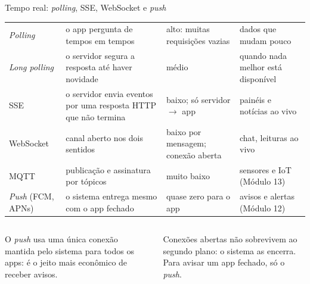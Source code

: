 \begin{frame}{Tempo real: \emph{polling}, SSE, WebSocket e \emph{push}}
  \scriptsize
  \begin{tabularx}{\textwidth}{@{}l L L L@{}}
    \toprule
     &  &  &  \\
    \midrule
    \emph{Polling} & o app pergunta de tempos em tempos & alto: muitas requisições vazias & dados que mudam pouco \\
    \emph{Long polling} & o servidor segura a resposta até haver novidade & médio & quando nada melhor está disponível \\
    SSE & o servidor envia eventos por uma resposta HTTP que não termina & baixo; só servidor $\rightarrow$ app & painéis e notícias ao vivo \\
    WebSocket & canal aberto nos dois sentidos & baixo por mensagem; conexão aberta & chat, leituras ao vivo \\
    MQTT & publicação e assinatura por tópicos & muito baixo & sensores e IoT (Módulo 13) \\
    \emph{Push} (FCM, APNs) & o sistema entrega mesmo com o app fechado & quase zero para o app & avisos e alertas (Módulo 12) \\
    \bottomrule
  \end{tabularx}
  \normalsize
  \vspace{4pt}
  \begin{columns}[T]
    \begin{column}{0.49\textwidth}
      \begin{conceito}
        O \emph{push} usa uma única conexão mantida pelo sistema para todos os apps: é o jeito mais econômico de receber avisos.
      \end{conceito}
    \end{column}
    \begin{column}{0.49\textwidth}
      \begin{atencao}
        Conexões abertas não sobrevivem ao segundo plano: o sistema as encerra. Para avisar um app fechado, só o \emph{push}.
      \end{atencao}
    \end{column}
  \end{columns}
\end{frame}
